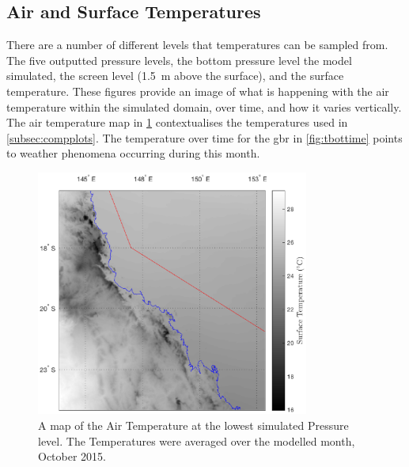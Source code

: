 \subsection{Air and Surface Temperatures}
\label{subsec:tempresults}

There are a number of different levels that temperatures can be sampled from. The five outputted pressure levels, the bottom pressure level the model simulated, the screen level (\SI{1.5}{\m} above the surface), and the surface temperature. These figures provide an image of what is happening with the air temperature within the simulated domain, over time, and how it varies vertically. The air temperature map in \cref{fig:tbotmap} contextualises the temperatures used in \cref{subsec:compplots}. The temperature over time for the \gls{gbr} in \cref{fig:tbottime} points to weather phenomena occurring during this month.

\begin{figure}[!hbt]
    \centering
    \includegraphics[width=0.8\textwidth]{Fig/Research/CCAM/TimeAveragedMap_tbot.eps}
    \vspace{-1cm}
    \caption{ A map of the Air Temperature at the lowest simulated Pressure level. The Temperatures were averaged over the modelled month, October 2015. }
    \label{fig:tbotmap}
\end{figure}

